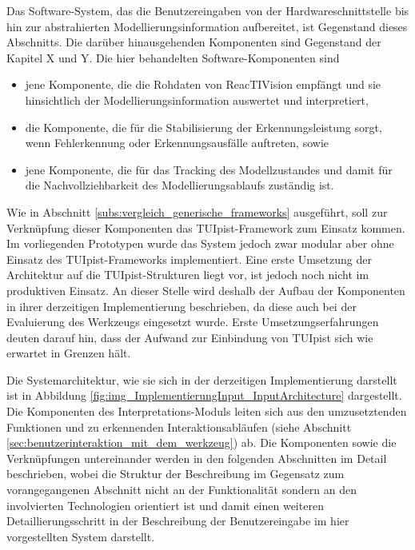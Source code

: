 Das Software-System, das die Benutzereingaben von der Hardwareschnittstelle bis hin zur abstrahierten Modellierungsinformation aufbereitet, ist Gegenstand dieses Abschnitts. Die darüber hinausgehenden Komponenten sind Gegenstand der Kapitel X und Y. Die hier behandelten Software-Komponenten sind
\begin{itemize}
	\item jene Komponente, die die Rohdaten von ReacTIVision empfängt und sie hinsichtlich der Modellierungsinformation auswertet und interpretiert,
	\item die Komponente, die für die Stabilisierung der Erkennungsleistung sorgt, wenn Fehlerkennung oder Erkennungsausfälle auftreten, sowie
	\item jene Komponente, die für das Tracking des Modellzustandes und damit für die Nachvollziehbarkeit des Modellierungsablaufs zuständig ist. 
\end{itemize}
Wie in Abschnitt \ref{subs:vergleich_generische_frameworks} ausgeführt, soll zur Verknüpfung dieser Komponenten das TUIpist-Framework zum Einsatz kommen. Im vorliegenden Prototypen wurde das System jedoch zwar modular aber ohne Einsatz des TUIpist-Frameworks implementiert. Eine erste Umsetzung der Architektur auf die TUIpist-Strukturen liegt vor, ist jedoch noch nicht im produktiven Einsatz. An dieser Stelle wird deshalb der Aufbau der Komponenten in ihrer derzeitigen Implementierung beschrieben, da diese auch bei der Evaluierung des Werkzeugs eingesetzt wurde. Erste Umsetzungserfahrungen deuten darauf hin, dass der Aufwand zur Einbindung von TUIpist sich wie erwartet in Grenzen hält.

Die Systemarchitektur, wie sie sich in der derzeitigen Implementierung darstellt ist in Abbildung \ref{fig:img_ImplementierungInput_InputArchitecture} dargestellt. Die Komponenten des Interpretations-Moduls leiten sich aus den umzusetztenden Funktionen und zu erkennenden Interaktionsabläufen (siehe Abschnitt \ref{sec:benutzerinteraktion_mit_dem_werkzeug}) ab. Die Komponenten sowie die Verknüpfungen untereinander werden in den folgenden Abschnitten im Detail beschrieben, wobei die Struktur der Beschreibung im Gegensatz zum vorangegangenen Abschnitt nicht an der Funktionalität sondern an den involvierten Technologien orientiert ist und damit einen weiteren Detaillierungsschritt in der Beschreibung der Benutzereingabe im hier vorgestellten System darstellt.

